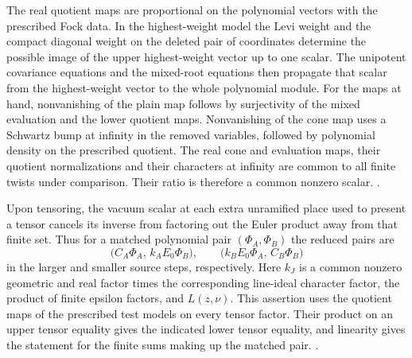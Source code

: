 The real quotient maps are proportional on the polynomial vectors
with the prescribed Fock data. In the highest-weight model the
Levi weight and the compact diagonal weight on the deleted pair of
coordinates determine the possible image of the upper highest-weight
vector up to one scalar. The unipotent covariance equations and the
mixed-root equations then propagate that scalar from the highest-weight
vector to the whole polynomial module. For the maps at hand,
nonvanishing of the plain map follows by surjectivity of the mixed
evaluation and the lower quotient maps. Nonvanishing of the cone
map uses a Schwartz bump at infinity in the removed variables,
followed by polynomial density on the prescribed quotient. The real
cone and evaluation maps, their quotient normalizations and their
characters at infinity are common to all finite twists under
comparison. Their ratio is therefore a common nonzero scalar.
.

Upon tensoring, the vacuum scalar at each extra unramified place
used to present a tensor cancels its inverse from factoring out the
Euler product away from that finite set. Thus for a matched
polynomial pair \((\Phi_A,\Phi_B)\) the reduced pairs are
\[
 \big(C_A\Phi_A,\,k_A E_0\Phi_B\big),\qquad
 \big(k_B E_0\Phi_A,\,C_B\Phi_B\big)
\]
in the larger and smaller source steps, respectively. Here \(k_J\)
is a common nonzero geometric and real factor times the corresponding
line-ideal character factor, the product of finite epsilon factors,
and \(L(z,\nu)\). This assertion uses the quotient maps of the
prescribed test models on every tensor factor. Their product on an
upper tensor equality gives the indicated lower tensor equality,
and linearity gives the statement for the finite sums making up the
matched pair.
.


